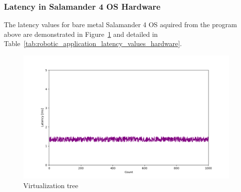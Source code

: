 \documentclass[MMR,Master,english]{twbook}
\begin{document}

\clearpage

\subsubsection{Latency in Salamander 4 OS Hardware}\label{subsubsec:latency_hardware}
\noindent The latency values for bare metal Salamander 4 OS aquired from the program above are demonstrated in Figure~\ref{fig:rtos_latencies} and detailed in Table~\ref{tab:robotic_application_latency_values_hardware}. 

\begin{figure}[H]
	\centering
	\includegraphics[width=1.0\columnwidth]{masterthesis-documentation/docs/resources/scripts/experiment/generated_latencies/rtos_latencies.png}
	\caption[Virtualization tree]{Virtualization tree}
	\label{fig:rtos_latencies}
\end{figure}
\end{document}
